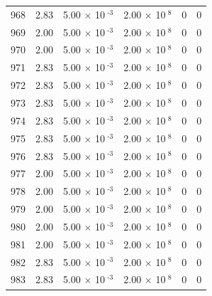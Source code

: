 \documentclass[a4paper,11pt]{article}
\begin{document}
\begin{center}
\begin{longtable}{|R{1.5cm}|R{2.4cm}|R{2.4cm}|R{2.4cm}|R{2.4cm}|R{2.4cm}|}
  968 &   2.83  &         5.00 $\times$ 10$^{\text{          -3}}$  &         2.00 $\times$ 10$^{\text{           8}}$  & 0  & 0 \\
  969 &   2.00  &         5.00 $\times$ 10$^{\text{          -3}}$  &         2.00 $\times$ 10$^{\text{           8}}$  & 0  & 0 \\
  970 &   2.00  &         5.00 $\times$ 10$^{\text{          -3}}$  &         2.00 $\times$ 10$^{\text{           8}}$  & 0  & 0 \\
  971 &   2.83  &         5.00 $\times$ 10$^{\text{          -3}}$  &         2.00 $\times$ 10$^{\text{           8}}$  & 0  & 0 \\
  972 &   2.83  &         5.00 $\times$ 10$^{\text{          -3}}$  &         2.00 $\times$ 10$^{\text{           8}}$  & 0  & 0 \\
  973 &   2.83  &         5.00 $\times$ 10$^{\text{          -3}}$  &         2.00 $\times$ 10$^{\text{           8}}$  & 0  & 0 \\
  974 &   2.83  &         5.00 $\times$ 10$^{\text{          -3}}$  &         2.00 $\times$ 10$^{\text{           8}}$  & 0  & 0 \\
  975 &   2.83  &         5.00 $\times$ 10$^{\text{          -3}}$  &         2.00 $\times$ 10$^{\text{           8}}$  & 0  & 0 \\
  976 &   2.83  &         5.00 $\times$ 10$^{\text{          -3}}$  &         2.00 $\times$ 10$^{\text{           8}}$  & 0  & 0 \\
  977 &   2.00  &         5.00 $\times$ 10$^{\text{          -3}}$  &         2.00 $\times$ 10$^{\text{           8}}$  & 0  & 0 \\
  978 &   2.00  &         5.00 $\times$ 10$^{\text{          -3}}$  &         2.00 $\times$ 10$^{\text{           8}}$  & 0  & 0 \\
  979 &   2.00  &         5.00 $\times$ 10$^{\text{          -3}}$  &         2.00 $\times$ 10$^{\text{           8}}$  & 0  & 0 \\
  980 &   2.00  &         5.00 $\times$ 10$^{\text{          -3}}$  &         2.00 $\times$ 10$^{\text{           8}}$  & 0  & 0 \\
  981 &   2.00  &         5.00 $\times$ 10$^{\text{          -3}}$  &         2.00 $\times$ 10$^{\text{           8}}$  & 0  & 0 \\
  982 &   2.83  &         5.00 $\times$ 10$^{\text{          -3}}$  &         2.00 $\times$ 10$^{\text{           8}}$  & 0  & 0 \\
  983 &   2.83  &         5.00 $\times$ 10$^{\text{          -3}}$  &         2.00 $\times$ 10$^{\text{           8}}$  & 0  & 0 \\

\end{longtable}
\end{center}
\end{document}
